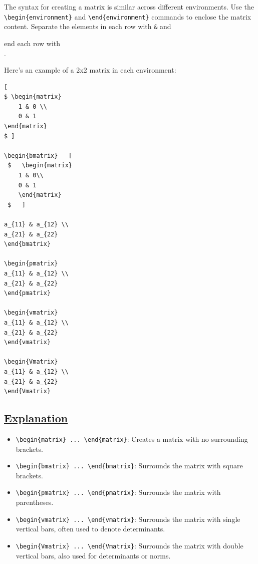 \documentclass{article}
\begin{document}
\LARGE{The syntax for creating a matrix is similar across different environments. Use the \texttt{\textbackslash begin\{environment\}} and \texttt{\textbackslash end\{environment\}} commands to enclose the matrix content. Separate the elements in each row with \texttt{\&} and 

end each row with \texttt{\\}.

Here’s an example of a 2x2 matrix in each environment:}
\begin{verbatim}
[ 
$ \begin{matrix}
    1 & 0 \\
    0 & 1 
\end{matrix}
$ ]

\begin{bmatrix}   [
 $   \begin{matrix}
    1 & 0\\
    0 & 1
    \end{matrix}
 $   ]

a_{11} & a_{12} \\
a_{21} & a_{22}
\end{bmatrix}

\begin{pmatrix}
a_{11} & a_{12} \\
a_{21} & a_{22}
\end{pmatrix}

\begin{vmatrix}
a_{11} & a_{12} \\
a_{21} & a_{22}
\end{vmatrix}

\begin{Vmatrix}
a_{11} & a_{12} \\
a_{21} & a_{22}
\end{Vmatrix}
\end{verbatim}

\begin{center}
\section*{\textbf{\underline{\LARGE{Explanation}}}}
\end{center}
\begin{itemize}
  \item \texttt{\textbackslash begin\{matrix\} ... \textbackslash end\{matrix\}}: Creates a matrix with no surrounding brackets.
  \item \texttt{\textbackslash begin\{bmatrix\} ... \textbackslash end\{bmatrix\}}: Surrounds the matrix with square brackets.
  \item \texttt{\textbackslash begin\{pmatrix\} ... \textbackslash end\{pmatrix\}}: Surrounds the matrix with parentheses.
  \item \texttt{\textbackslash begin\{vmatrix\} ... \textbackslash end\{vmatrix\}}: Surrounds the matrix with single vertical bars, often used to denote determinants.
  \item \texttt{\textbackslash begin\{Vmatrix\} ... \textbackslash end\{Vmatrix\}}: Surrounds the matrix with double vertical bars, also used for determinants or norms.
\end{itemize}
\end{document}
